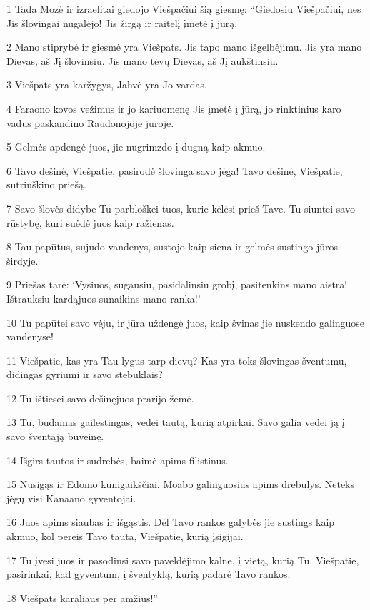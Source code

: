 \par 1 Tada Mozė ir izraelitai giedojo Viešpačiui šią giesmę: “Giedosiu Viešpačiui, nes Jis šlovingai nugalėjo! Jis žirgą ir raitelį įmetė į jūrą. 
\par 2 Mano stiprybė ir giesmė yra Viešpats. Jis tapo mano išgelbėjimu. Jis yra mano Dievas, aš Jį šlovinsiu. Jis mano tėvų Dievas, aš Jį aukštinsiu. 
\par 3 Viešpats yra karžygys, Jahvė yra Jo vardas. 
\par 4 Faraono kovos vežimus ir jo kariuomenę Jis įmetė į jūrą, jo rinktinius karo vadus paskandino Raudonojoje jūroje. 
\par 5 Gelmės apdengė juos, jie nugrimzdo į dugną kaip akmuo. 
\par 6 Tavo dešinė, Viešpatie, pasirodė šlovinga savo jėga! Tavo dešinė, Viešpatie, sutriuškino priešą. 
\par 7 Savo šlovės didybe Tu parbloškei tuos, kurie kėlėsi prieš Tave. Tu siuntei savo rūstybę, kuri suėdė juos kaip ražienas. 
\par 8 Tau papūtus, sujudo vandenys, sustojo kaip siena ir gelmės sustingo jūros širdyje. 
\par 9 Priešas tarė: ‘Vysiuos, sugausiu, pasidalinsiu grobį, pasitenkins mano aistra! Ištrauksiu kardą­juos sunaikins mano ranka!’ 
\par 10 Tu papūtei savo vėju, ir jūra uždengė juos, kaip švinas jie nuskendo galinguose vandenyse! 
\par 11 Viešpatie, kas yra Tau lygus tarp dievų? Kas yra toks šlovingas šventumu, didingas gyriumi ir savo stebuklais? 
\par 12 Tu ištiesei savo dešinę­juos prarijo žemė. 
\par 13 Tu, būdamas gailestingas, vedei tautą, kurią atpirkai. Savo galia vedei ją į savo šventąją buveinę. 
\par 14 Išgirs tautos ir sudrebės, baimė apims filistinus. 
\par 15 Nusigąs ir Edomo kunigaikščiai. Moabo galinguosius apims drebulys. Neteks jėgų visi Kanaano gyventojai. 
\par 16 Juos apims siaubas ir išgąstis. Dėl Tavo rankos galybės jie sustings kaip akmuo, kol pereis Tavo tauta, Viešpatie, kurią įsigijai. 
\par 17 Tu įvesi juos ir pasodinsi savo paveldėjimo kalne, į vietą, kurią Tu, Viešpatie, pasirinkai, kad gyventum, į šventyklą, kurią padarė Tavo rankos. 
\par 18 Viešpats karaliaus per amžius!” 
